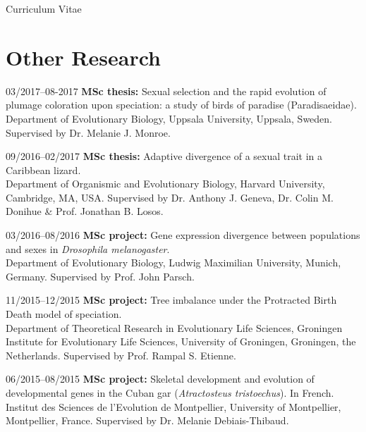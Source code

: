 \documentclass[11pt,a4paper]{article}
\begin{document}
\begin{cv}{Curriculum Vitae}
\begin{cvlist}{}
        \end{cvlist}
        
		\section{Other Research}
		
		\begin{cvlist}{}
			
			\item[03/2017--08-2017] 
			\textbf{MSc thesis:} Sexual selection and the rapid evolution of plumage coloration upon speciation: a study of birds of paradise (Paradisaeidae).\\ Department of Evolutionary Biology, Uppsala University, Uppsala, Sweden. Supervised by Dr. Melanie J. Monroe.
			
			\item[09/2016--02/2017] 
			\textbf{MSc thesis:} Adaptive divergence of a sexual trait in a Caribbean lizard.\\
			Department of Organismic and Evolutionary Biology, Harvard University, Cambridge, MA, USA.	Supervised by Dr. Anthony J. Geneva, Dr. Colin M. Donihue \& Prof. Jonathan B. Losos.
			
			\item[03/2016--08/2016] 
			\textbf{MSc project:} Gene expression divergence between populations and sexes in \textit{Drosophila melanogaster}.\\
			Department of Evolutionary Biology, Ludwig Maximilian University, Munich, Germany. Supervised by Prof. John Parsch.
			
			\item[11/2015--12/2015] 
			\textbf{MSc project:} Tree imbalance under the Protracted Birth Death model of speciation.\\ Department of Theoretical Research in Evolutionary Life Sciences, Groningen Institute for Evolutionary Life Sciences, University of Groningen, Groningen, the Netherlands. Supervised by Prof. Rampal S. Etienne.
			
			\item[06/2015--08/2015] 
			\textbf{MSc project:} Skeletal development and evolution of developmental genes in the Cuban gar (\textit{Atractosteus tristoechus}). In French.\\ 
			Institut des Sciences de l'Evolution de Montpellier, University of Montpellier, Montpellier, France. Supervised by Dr. Melanie Debiais-Thibaud.
			
		\end{cvlist}
		

\end{cv}
\end{document}
